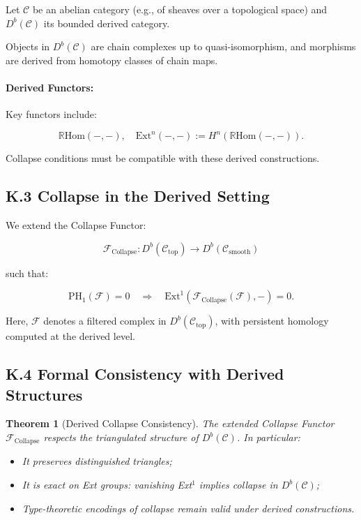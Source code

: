 \documentclass[11pt]{article}
\newtheorem{theorem}{Theorem}[section]
\begin{document}
Let \( \mathcal{C} \) be an abelian category (e.g., of sheaves over a topological space) and \( D^b(\mathcal{C}) \) its bounded derived category.

Objects in \( D^b(\mathcal{C}) \) are chain complexes up to quasi-isomorphism, and morphisms are derived from homotopy classes of chain maps.

\paragraph{Derived Functors:}
Key functors include:

\[
\mathbb{R}\mathrm{Hom}(-, -), \quad \mathrm{Ext}^n(-, -) := H^n(\mathbb{R}\mathrm{Hom}(-, -)).
\]

Collapse conditions must be compatible with these derived constructions.

\subsection*{K.3 Collapse in the Derived Setting}

We extend the Collapse Functor:

\[
\mathcal{F}_{\mathrm{Collapse}} : D^b(\mathcal{C}_{\mathrm{top}}) \to D^b(\mathcal{C}_{\mathrm{smooth}})
\]

such that:

\[
\mathrm{PH}_1(\mathcal{F}) = 0 \quad \Rightarrow \quad \mathrm{Ext}^1(\mathcal{F}_{\mathrm{Collapse}}(\mathcal{F}), -) = 0.
\]

Here, \( \mathcal{F} \) denotes a filtered complex in \( D^b(\mathcal{C}_{\mathrm{top}}) \), with persistent homology computed at the derived level.

\subsection*{K.4 Formal Consistency with Derived Structures}

\begin{theorem}[Derived Collapse Consistency]
The extended Collapse Functor \( \mathcal{F}_{\mathrm{Collapse}} \) respects the triangulated structure of \( D^b(\mathcal{C}) \). In particular:

\begin{itemize}
    \item It preserves distinguished triangles;
    \item It is exact on Ext groups: vanishing Ext$^1$ implies collapse in \( D^b(\mathcal{C}) \);
    \item Type-theoretic encodings of collapse remain valid under derived constructions.
\end{itemize}
\end{theorem}
\end{document}
